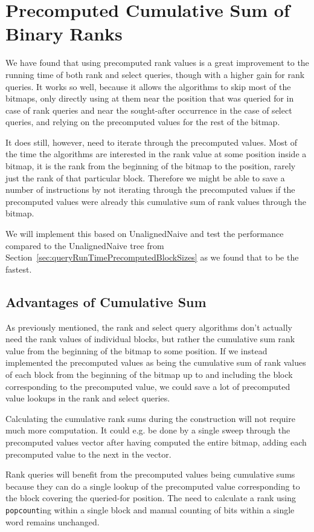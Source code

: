 \section{Precomputed Cumulative Sum of Binary Ranks}
We have found that using precomputed rank values is a great improvement to the running time of both rank and select queries, though with a higher gain for rank queries.
It works so well, because it allows the algorithms to skip most of the bitmaps, only directly using at them near the position that was queried for in case of rank queries and near the sought-after occurrence in the case of select queries, and relying on the precomputed values for the rest of the bitmap.

It does still, however, need to iterate through the precomputed values.
Most of the time the algorithms are interested in the rank value at some position inside a bitmap, it is the rank from the beginning of the bitmap to the position, rarely just the rank of that particular block.
Therefore we might be able to save a number of instructions by not iterating through the precomputed values if the precomputed values were already this cumulative sum of rank values through the bitmap.

We will implement this based on UnalignedNaive and test the performance compared to the UnalignedNaive tree from Section~\ref{sec:queryRunTimePrecomputedBlockSizes} as we found that to be the fastest.

\subsection{Advantages of Cumulative Sum}
As previously mentioned, the rank and select query algorithms don't actually need the rank values of individual blocks, but rather the cumulative sum rank value from the beginning of the bitmap to some position.
If we instead implemented the precomputed values as being the cumulative sum of rank values of each block from the beginning of the bitmap up to and including the block corresponding to the precomputed value, we could save a lot of precomputed value lookups in the rank and select queries.

Calculating the cumulative rank sums during the construction will not require much more computation.
It could e.g. be done by a single sweep through the precomputed values vector after having computed the entire bitmap, adding each precomputed value to the next in the vector.

Rank queries will benefit from the precomputed values being cumulative sums because they can do a single lookup of the precomputed value corresponding to the block covering the queried-for position.
The need to calculate a rank using \texttt{popcount}ing within a single block and manual counting of bits within a single word remains unchanged.

